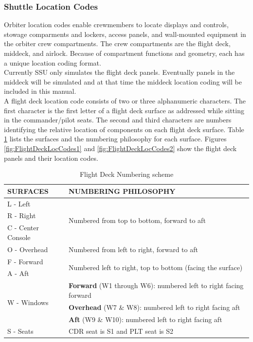 \documentclass[13pt]{article}
\begin{document}
\begin{multicols*}{2}
\subsubsection{Shuttle Location Codes}
Orbiter location codes enable crewmembers to locate displays and controls, stowage comparments and lockers, access panels, and wall-mounted equipment in the orbiter crew compartments. The crew compartments are the flight deck, middeck, and airlock. Because of compartment functions and geometry, each has a unique location coding format.
\\
Currently SSU only simulates the flight deck panels. Eventually panels in the middeck will be simulated and at that time the middeck location coding will be included in this manual.
\\
A flight deck location code consists of two or three alphanumeric characters. The first character is the first letter of a flight deck surface as addressed while sitting in the commander/pilot seats.
The second and third characters are numbers identifying the relative location of components on each flight deck surface. Table \ref{tab:PanelNumbering} lists the surfaces and the numbering philosophy for each surface.
Figures \ref{fig:FlightDeckLocCodes1} and \ref{fig:FlightDeckLocCodes2} show the flight deck panels and their location codes.
\begin{table}[H]
  \begin{tabularx}{\linewidth}{l | X}
    SURFACES & NUMBERING PHILOSOPHY \\
    \hline
    L - Left & \multirow{3}{\linewidth}{Numbered from top to bottom, forward to aft} \\
    R - Right & \\
    C - Center Console & \\
    \hline
    O - Overhead & Numbered from left to right, forward to aft \\
    \hline
    F - Forward & \multirow{2}{\linewidth}{Numbered left to right, top to bottom (facing the surface)} \\
    A - Aft & \\
    \hline
    \multirow{3}{*}{W - Windows} & \textbf{Forward} (W1 through W6): numbered left to right facing forward \\
    & \textbf{Overhead} (W7 \& W8): numbered left to right facing aft \\
    & \textbf{Aft} (W9 \& W10): numbered left to right facing aft \\
    \hline
    S - Seats & CDR seat is S1 and PLT seat is S2
  \end{tabularx}
  \caption{Flight Deck Numbering scheme}
  \label{tab:PanelNumbering}
\end{table}
\end{multicols*}
\end{document}
